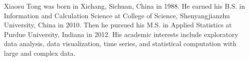 %
%
%
%

\begin{vita}

Xiaosu Tong was born in Xichang, Sichuan, China in 1988. He earned his B.S. in 
Information and Calculation Science at College of Science, Shenyangjianzhu 
University, China in 2010. Then he pursued his M.S. in Applied Statistics at Purdue
University, Indiana in 2012. His academic interests include exploratory data 
analysis, data visualization, time series, and statistical computation with
large and complex data.

\end{vita}

